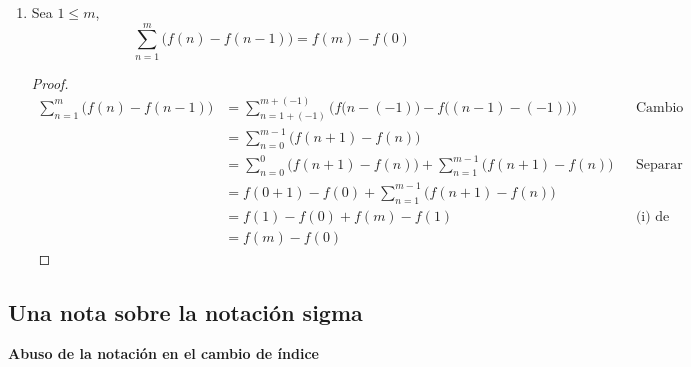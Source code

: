 \begin{enumerate}[label=\alph*)]
\begin{enumerate}[label=\roman*)]
  \item Sea $1\leq m$, \[\sum_{n=1}^{m} \Big(f(n)-f(n-1)\Big) = f(m)-f(0)\]
  \begin{proof}\leavevmode
    \begin{align*}
      \sum_{n=1}^{m} \Big(f(n)-f(n-1)\Big) &= \sum_{n=1+(-1)}^{m+(-1)} \bigg( f\big(n-(-1)\big)-f\big((n-1)-(-1)\big)\bigg) && \text{Cambio de índice}\\
      &= \sum_{n=0}^{m-1} \Big(f(n+1)-f(n)\Big)\\
      &= \sum_{n=0}^{0} \Big(f(n+1)-f(n)\Big) + \sum_{n=1}^{m-1} \Big(f(n+1)-f(n)\Big) && \text{Separar la suma}\\
      &= f(0+1) - f(0) + \sum_{n=1}^{m-1} \Big(f(n+1)-f(n)\Big)\\
      &= f(1) - f(0) + f(m) - f(1) && \text{(i) de este corolario}\\
      &= f(m) - f(0)
    \end{align*}
  \end{proof}
  \end{enumerate}

    
  \end{enumerate}

\subsection*{Una nota sobre la notación sigma}




\textbf{Abuso de la notación en el cambio de índice}


